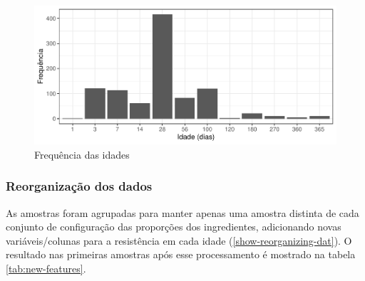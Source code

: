 \documentclass[]{article}
\begin{document}
~

\begin{figure}

{\centering \includegraphics{paper_PT_files/figure-latex/freq-ages-1} 

}

\caption{Frequência das idades}\label{fig:freq-ages}
\end{figure}

\hypertarget{reorganizauxe7uxe3o-dos-dados}{%
\subsubsection{Reorganização dos
dados}\label{reorganizauxe7uxe3o-dos-dados}}

As amostras foram agrupadas para manter apenas uma amostra distinta de
cada conjunto de configuração das proporções dos ingredientes,
adicionando novas variáveis/colunas para a resistência em cada idade
(\ref{show-reorganizing-dat}). O resultado nas primeiras amostras após
esse processamento é mostrado na tabela \ref{tab:new-features}.

~
\end{document}
